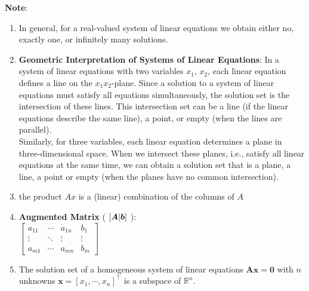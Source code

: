 \begin{enumerate}
    
    
\end{enumerate}


\vspace{0.5cm}
\textbf{Note}:
\begin{enumerate}
    \item In general, for a real-valued system of linear equations we obtain either no, exactly one, or infinitely many solutions. 
    \hfill \cite{mfml/book/mml/Deisenroth-Faisal-Ong}

    \item \textbf{Geometric Interpretation of Systems of Linear Equations}: 
    In a system of linear equations with two variables $x_1$, $x_2$, each linear equation defines a line on the $x_1x_2$-plane. Since a solution to a system of linear equations must satisfy all equations simultaneously, the solution set is the intersection of these lines. This intersection set can be a line (if the linear equations describe the same line), a point, or empty (when the lines are parallel).
    \hfill \cite{mfml/book/mml/Deisenroth-Faisal-Ong}
    \\
    Similarly, for three variables, each linear equation determines a plane in three-dimensional space. When we intersect these planes, i.e., satisfy all linear equations at the same time, we can obtain a solution set that is a plane, a line, a point or empty (when the planes have no common intersection).
    \hfill \cite{mfml/book/mml/Deisenroth-Faisal-Ong}

    \item the product $Ax$ is a (linear) combination of the columns of $A$
    \hfill \cite{mfml/book/mml/Deisenroth-Faisal-Ong}

    \item \textbf{Augmented Matrix} ( $\left[\bm{A}|\bm{b}\right]$ ): 
    \\[0.2cm]
    $
        \left[
        \begin{array}{ccc|c}
            a_{11} & \cdots & a_{1n} & b_{1}\\
            \vdots & \ddots & \vdots & \vdots \\
            a_{m1} & \cdots & a_{mn} & b_{m}
        \end{array}
        \right]
    $

    \item The solution set of a homogeneous system of linear equations $\bm{Ax} = \bm{0}$ with $n$ unknowns $\bm{x} = [x_1, \cdots , x_n]^\top$ is a subspace of $\mathbb{R}^n$.
    \hfill \cite{mfml/book/mml/Deisenroth-Faisal-Ong}


\end{enumerate}
